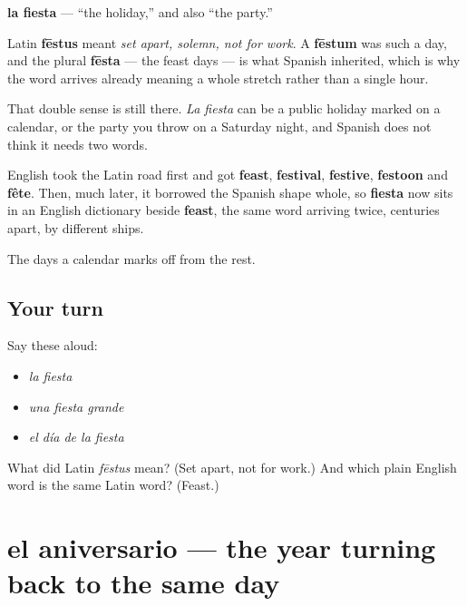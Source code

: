 \begin{cousinweb}
\textbf{la fiesta} — \textquotedblleft{}the holiday,\textquotedblright{} and also \textquotedblleft{}the party.\textquotedblright{}

Latin \textbf{fēstus} meant \emph{set apart, solemn, not for work}. A \textbf{fēstum} was such a day, and the plural \textbf{fēsta} — the feast days — is what Spanish inherited, which is why the word arrives already meaning a whole stretch rather than a single hour.

That double sense is still there. \emph{La fiesta} can be a public holiday marked on a calendar, or the party you throw on a Saturday night, and Spanish does not think it needs two words.

English took the Latin road first and got \textbf{feast}, \textbf{festival}, \textbf{festive}, \textbf{festoon} and \textbf{fête}. Then, much later, it borrowed the Spanish shape whole, so \textbf{fiesta} now sits in an English dictionary beside \textbf{feast}, the same word arriving twice, centuries apart, by different ships.
\end{cousinweb}

\begin{grammarlens}[title={What you've built}]
The days a calendar marks off from the rest.
\end{grammarlens}

\subsection*{Your turn}
Say these aloud:

\begin{itemize}
\raggedright
  \item \emph{la fiesta}
  \item \emph{una fiesta grande}
  \item \emph{el día de la fiesta}
\end{itemize}

\begin{tcolorbox}[breakable,colback=teal!4,colframe=teal!35!black,title={Before you move on}]
What did Latin \emph{fēstus} mean? (Set apart, not for work.) And which plain English word is the same Latin word? (Feast.)
\end{tcolorbox}
\section[el aniversario]{el aniversario — the year turning back to the same day}

